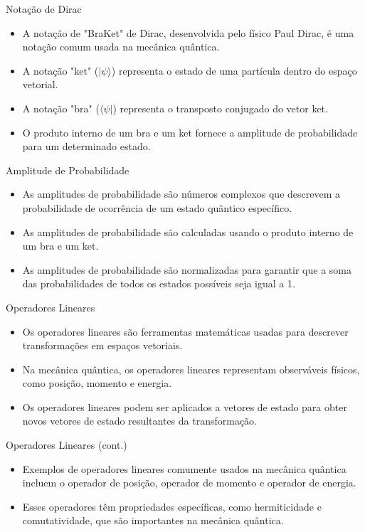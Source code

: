 	\begin{frame}{Notação de Dirac}
		\begin{itemize}
			\item A notação de "BraKet" de Dirac, desenvolvida pelo físico Paul Dirac, é uma notação comum usada na mecânica quântica.
			\item A notação "ket" ($|\psi\rangle$) representa o estado de uma partícula dentro do espaço vetorial.
			\item A notação "bra" ($\langle\psi|$) representa o transposto conjugado do vetor ket.
			\item O produto interno de um bra e um ket fornece a amplitude de probabilidade para um determinado estado.
		\end{itemize}
	\end{frame}
	
	\begin{frame}{Amplitude de Probabilidade}
		\begin{itemize}
			\item As amplitudes de probabilidade são números complexos que descrevem a probabilidade de ocorrência de um estado quântico específico.
			\item As amplitudes de probabilidade são calculadas usando o produto interno de um bra e um ket.
			\item As amplitudes de probabilidade são normalizadas para garantir que a soma das probabilidades de todos os estados possíveis seja igual a 1.
		\end{itemize}
	\end{frame}
	
	\begin{frame}{Operadores Lineares}
		\begin{itemize}
			\item Os operadores lineares são ferramentas matemáticas usadas para descrever transformações em espaços vetoriais.
			\item Na mecânica quântica, os operadores lineares representam observáveis físicos, como posição, momento e energia.
			\item Os operadores lineares podem ser aplicados a vetores de estado para obter novos vetores de estado resultantes da transformação.
		\end{itemize}
	\end{frame}
	
	\begin{frame}{Operadores Lineares (cont.)}
		\begin{itemize}
			\item Exemplos de operadores lineares comumente usados na mecânica quântica incluem o operador de posição, operador de momento e operador de energia.
			\item Esses operadores têm propriedades específicas, como hermiticidade e comutatividade, que são importantes na mecânica quântica.
		\end{itemize}
	\end{frame}
	
